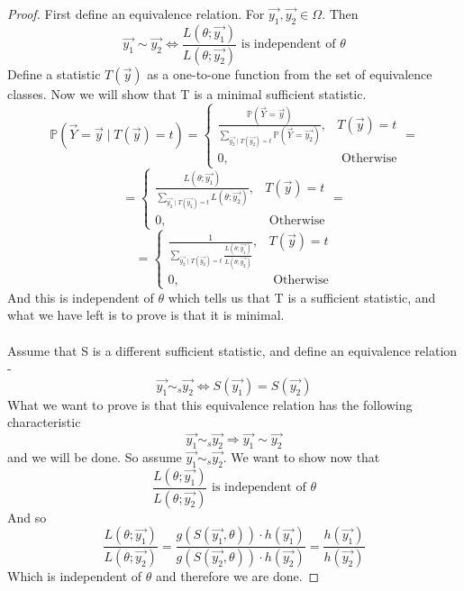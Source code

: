 \documentclass[../main.tex]{subfiles}
\begin{document}
\begin{proof}
First define an equivalence relation. For $\overrightarrow{y_1},\overrightarrow{y_2}\in\Omega$. Then \[\overrightarrow{y_1}\sim\overrightarrow{y_2}\Longleftrightarrow \frac{L(\theta;\overrightarrow{y_1})}{L(\theta;\overrightarrow{y_2})} \text{ is independent of }\theta\]
Define a statistic $T(\overrightarrow{y})$ as a one-to-one function from the set of equivalence classes. Now we will show that T is a minimal sufficient statistic. \[\mathbb{P}(\overrightarrow{Y}=\overrightarrow{y}\mid T(\overrightarrow{y})=t) = \begin{cases}
\frac{\mathbb{P}(\overrightarrow{Y}=\overrightarrow{y})}{\sum_{\overrightarrow{y_2}\mid T(\overrightarrow{y_2})=t}\mathbb{P}(\overrightarrow{Y}=\overrightarrow{y_2})} , & T(\overrightarrow{y})=t \\ 0 , & \text{ Otherwise}
\end{cases} = \]\[=\begin{cases}
\frac{L(\theta;\overrightarrow{y_1})}{\sum_{\overrightarrow{y_2}\mid T(\overrightarrow{y_2})=t}L(\theta;\overrightarrow{y_2})} , & T(\overrightarrow{y})=t \\ 0 , & \text{ Otherwise}
\end{cases}=\]
\[=\begin{cases}
\frac{1}{\sum_{\overrightarrow{y_2}\mid T(\overrightarrow{y_2})=t}\frac{L(\theta;\overrightarrow{y_1})}{L(\theta;\overrightarrow{y_2})}} , & T(\overrightarrow{y})=t \\ 0 , & \text{ Otherwise}
\end{cases}\]
And this is independent of $\theta$ which tells us that T is a sufficient statistic, and what we have left is to prove is that it is minimal. \\\\
Assume that S is a different sufficient statistic, and define an equivalence relation - 
\[\overrightarrow{y_1}\sim_s\overrightarrow{y_2}\Longleftrightarrow S(\overrightarrow{y_1})=S(\overrightarrow{y_2})\]
What we want to prove is that this equivalence relation has the following characteristic \[\overrightarrow{y_1}\sim_s\overrightarrow{y_2}\Longrightarrow \overrightarrow{y_1}\sim\overrightarrow{y_2}\]
and we will be done.
\newpage 
So assume $\overrightarrow{y_1}\sim_s\overrightarrow{y_2}$. We want to show now that 
\[ \frac{L(\theta;\overrightarrow{y_1})}{L(\theta;\overrightarrow{y_2})} \text{ is independent of }\theta\]
And so
\[ \frac{L(\theta;\overrightarrow{y_1})}{L(\theta;\overrightarrow{y_2})} = \frac{g(S(\overrightarrow{y_1},\theta))\cdot h(\overrightarrow{y_1})}{g(S(\overrightarrow{y_2},\theta))\cdot h(\overrightarrow{y_2})} = \frac{h(\overrightarrow{y_1})}{h(\overrightarrow{y_2})}\]
Which is independent of $\theta$ and therefore we are done.\end{proof}
\end{document}
